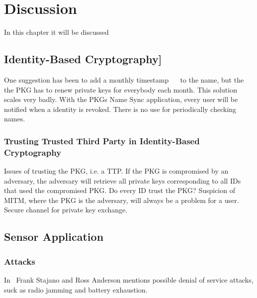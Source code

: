 \chapter{Discussion}
In this chapter it will be discussed 

\section{Identity-Based Cryptography]}
One suggestion has been to add a monthly timestamp~\cite{DBLP:journals/iacr/BoldyrevaGK12} ~\cite{DBLP:conf/ctrsa/LibertV09}  to the name, but the the \gls{PKG} has to renew private keys for everybody each month. 
This solution scales very badly.
With the \gls{PKG}s Name Sync application, every user will be notified when a identity is revoked.
There is no use for periodically checking names.

\subsection{Trusting Trusted Third Party in Identity-Based Cryptography}
Issues of trusting the \gls{PKG}, i.e. a \gls{TTP}. 
If the \gls{PKG} is compromised by an adversary, the adversary will retrieve all private keys corresponding to all IDs that used the compromised \gls{PKG}. 
Do every ID trust the \gls{PKG}? Suspicion of \gls{MITM}, where the \gls{PKG} is the adversary, will always be a problem for a user.
Secure channel for private key exchange. 

\section{Sensor Application}

\subsection{Attacks}
In~\cite{DBLP:conf/spw/StajanoA99} Frank Stajano and Ross Anderson mentions possible denial of service attacks, suck as radio jamming and battery exhaustion. 